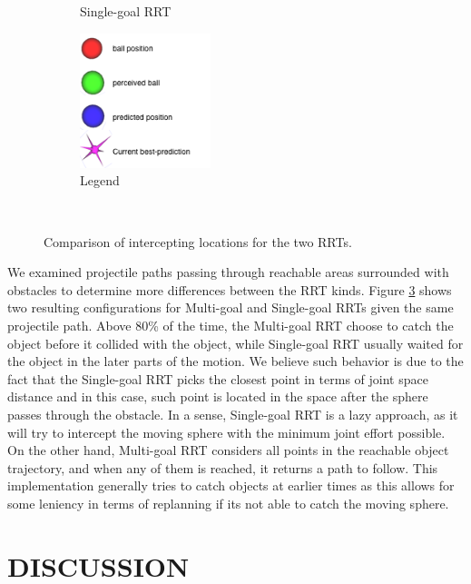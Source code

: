\documentclass[letterpaper, 10 pt, conference]{ieeeconf}  %
\begin{document}
\begin{figure}
\begin{subfigure}[b]{0.4\textwidth}
                \caption{Single-goal RRT}
                \label{fig:vissingle}
        \end{subfigure}
        \begin{subfigure}[b]{0.4\textwidth}
                \centering
                \includegraphics[width=1.5in]{fig/legends}
                \caption{Legend}
                \label{fig:legends}
        \end{subfigure}
        ~ %
        \caption{Comparison of intercepting locations for the two RRTs.
        }\label{fig:visrrts}
\end{figure}

We examined projectile paths passing through reachable areas surrounded
with obstacles to determine more differences between the RRT
kinds. Figure \ref{fig:visrrts} shows two resulting configurations for
Multi-goal and Single-goal RRTs given the same projectile path. Above
80\% of the time, the Multi-goal RRT choose to catch the object before it
collided with the object, while Single-goal RRT usually waited for the
object in the later parts of the motion. We believe such behavior is due
to the fact that the Single-goal RRT picks the closest point in terms of
joint space distance and in this case, such point is located in the
space after the sphere passes through the obstacle. In a sense,
Single-goal RRT is a lazy approach, as it will try to intercept the
moving sphere with the minimum joint effort possible. On the other hand,
Multi-goal RRT considers all points in the reachable object trajectory,
and when any of them is reached, it returns a path to follow. This
implementation generally tries to catch objects at earlier times as this
allows for some leniency in terms of replanning if its not able to catch
the moving sphere.



\section{DISCUSSION}
\end{document}
